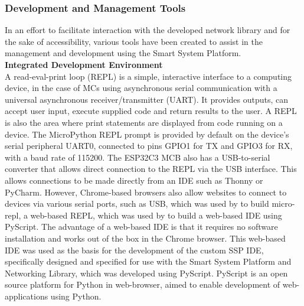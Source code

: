 \subsubsection{\label{sec:methods_pyscript}Development and Management Tools}

In an effort to facilitate interaction with the developed network library and for the sake of accessibility, various tools have been created to assist in the management and development using the Smart System Platform.\\

\textbf{\label{sec:methods_ide}Integrated Development Environment}\\

A read-eval-print loop (REPL) is a simple, interactive interface to a computing device, in the case of MCs using asynchronous serial communication with a universal asynchronous receiver/transmitter (UART). It provides outputs, can accept user input, execute supplied code and return results to the user. A REPL is also the area where print statements are displayed from code running on a device. The MicroPython REPL prompt is provided by default on the device's serial peripheral UART0, connected to pins GPIO1 for TX and GPIO3 for RX, with a baud rate of 115200. \citep{micropython_micropython_2025} The ESP32C3 MCB also has a USB-to-serial converter that allows direct connection to the REPL via the USB interface. This allows connections to be made directly from an IDE such as Thonny or PyCharm. However, Chrome-based browsers also allow websites to connect to devices via various serial ports, such as USB, which was used by \citet{webreflection_micro-repl_nodate} to build micro-repl, a web-based REPL, which was used by \citet[]{rogers_serial_nodate} to build a web-based IDE using PyScript. The advantage of a web-based IDE is that it requires no software installation and works out of the box in the Chrome browser. This web-based IDE was used as the basis for the development of the custom SSP IDE, specifically designed and specified for use with the Smart System Platform and Networking Library, which was developed using PyScript. PyScript is an open source platform for Python in web-browser, aimed to enable development of web-applications using Python. \citep{anaconda_inc_pyscript_2025,anaconda_inc_pyscript_nodate,anaconda_inc_pyscriptnet_nodate}\\


